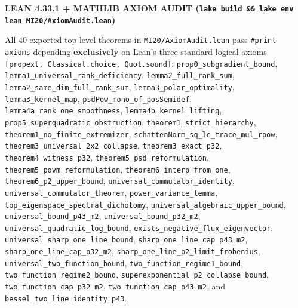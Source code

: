 \documentclass[10pt,letterpaper]{article}
\begin{document}
\begin{tcolorbox}[leanbox]
{\sffamily\footnotesize\bfseries\color{leanborder}LEAN 4.33.1 + MATHLIB AXIOM AUDIT (\texttt{lake build \&\& lake env lean MI20/AxiomAudit.lean})}\par\vspace{2.5pt}
{\raggedright\small All 40 exported top-level theorems in \texttt{MI20/AxiomAudit.lean} pass \texttt{\#print axioms} depending \textbf{exclusively} on Lean's three standard logical axioms \texttt{[propext, Classical.choice, Quot.sound]}: \texttt{prop0\_subgradient\_bound}, \texttt{lemma1\_universal\_rank\_deficiency}, \texttt{lemma2\_full\_rank\_sum}, \texttt{lemma2\_same\_dim\_full\_rank\_sum}, \texttt{lemma3\_polar\_optimality}, \texttt{lemma3\_kernel\_map}, \texttt{psdPow\_mono\_of\_posSemidef}, \texttt{lemma4a\_rank\_one\_smoothness}, \texttt{lemma4b\_kernel\_lifting}, \texttt{prop5\_superquadratic\_obstruction}, \texttt{theorem1\_strict\_hierarchy}, \texttt{theorem1\_no\_finite\_extremizer}, \texttt{schattenNorm\_sq\_le\_trace\_mul\_rpow}, \texttt{theorem3\_universal\_2x2\_collapse}, \texttt{theorem3\_exact\_p32}, \texttt{theorem4\_witness\_p32}, \texttt{theorem5\_psd\_reformulation}, \texttt{theorem5\_povm\_reformulation}, \texttt{theorem6\_interp\_from\_one}, \texttt{theorem6\_p2\_upper\_bound}, \texttt{universal\_commutator\_identity}, \texttt{universal\_commutator\_theorem}, \texttt{power\_variance\_lemma}, \texttt{top\_eigenspace\_spectral\_dichotomy}, \texttt{universal\_algebraic\_upper\_bound}, \texttt{universal\_bound\_p43\_m2}, \texttt{universal\_bound\_p32\_m2}, \texttt{universal\_quadratic\_log\_bound}, \texttt{exists\_negative\_flux\_eigenvector}, \texttt{universal\_sharp\_one\_line\_bound}, \texttt{sharp\_one\_line\_cap\_p43\_m2}, \texttt{sharp\_one\_line\_cap\_p32\_m2}, \texttt{sharp\_one\_line\_p2\_limit\_frobenius}, \texttt{universal\_two\_function\_bound}, \texttt{two\_function\_regime1\_bound}, \texttt{two\_function\_regime2\_bound}, \texttt{superexponential\_p2\_collapse\_bound}, \texttt{two\_function\_cap\_p32\_m2}, \texttt{two\_function\_cap\_p43\_m2}, and \texttt{bessel\_two\_line\_identity\_p43}.\par}
\end{tcolorbox}
\end{document}
